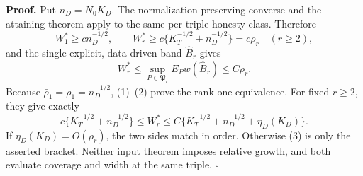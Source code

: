 \textbf{Proof.}
Put \(n_D=N_0K_D\). The normalization-preserving converse and the attaining theorem apply to the same per-triple honesty class. Therefore
\[
 W_1^*\ge cn_D^{-1/2},\qquad
 W_r^*\ge c\{K_T^{-1/2}+n_D^{-1/2}\}=c\rho_r\quad(r\ge2), \tag{1}
\]
and the single explicit, data-driven band \(\widehat B_r\) gives
\[
 W_r^*\le\sup_{P\in\mathfrak P_r}E_Pw(\widehat B_r)
 \le C\bar\rho_r.                                        \tag{2}
\]
Because \(\bar\rho_1=\rho_1=n_D^{-1/2}\), (1)--(2) prove the rank-one equivalence. For fixed \(r\ge2\), they give exactly
\[
 c\{K_T^{-1/2}+n_D^{-1/2}\}
 \le W_r^*\le
 C\{K_T^{-1/2}+n_D^{-1/2}+\eta_D(K_D)\}.                 \tag{3}
\]
If \(\eta_D(K_D)=O(\rho_r)\), the two sides match in order. Otherwise (3) is only the asserted bracket. Neither input theorem imposes relative growth, and both evaluate coverage and width at the same triple. \(\square\)